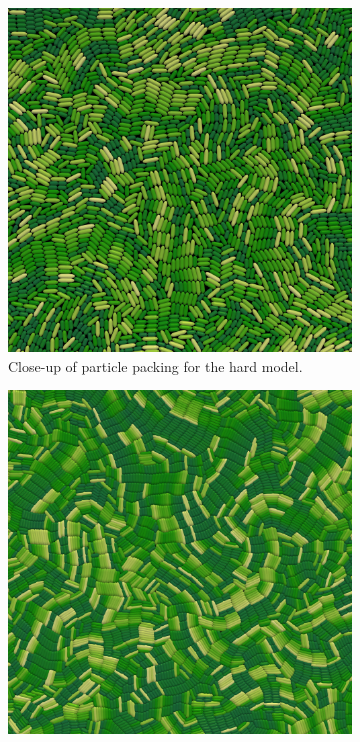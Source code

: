 \documentclass[conference]{IEEEtran}
\begin{document}
\begin{figure}[H]
    \centering
    \begin{subfigure}[b]{0.49\columnwidth}
        \centering
        \includegraphics[width=\linewidth]{figures/comparison_plots/density_hard.jpeg}
        \caption{Close-up of particle packing for the hard model.}
        \label{fig:packing_hard}
    \end{subfigure}
    \begin{subfigure}[b]{0.49\columnwidth}
        \centering
        \includegraphics[width=\linewidth]{figures/comparison_plots/density_soft.jpeg}

\end{subfigure}
\end{figure}
\end{document}
